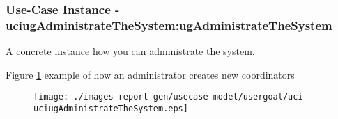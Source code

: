 
	\subsubsection{Use-Case Instance - uciugAdministrateTheSystem:ugAdministrateTheSystem}
	
	A concrete instance how you can administrate the system.		  
	\begin{operationmodel}
	
	\end{operationmodel} 

	
	Figure \ref{fig:lu.uni.lassy.excalibur.MyCrash.G02-RE-UC-uci-uciugAdministrateTheSystem}
	example of how an administrator creates new coordinators
	
	\begin{figure}[htbp]
	\begin{center}
	
	\texttt{[image: ./images-report-gen/usecase-model/usergoal/uci-uciugAdministrateTheSystem.eps]}
	\end{center}
	\caption[lu.uni.lassy.excalibur.MyCrash.G02 Sequence Diagram: uci-uciugAdministrateTheSystem]{}
	\label{fig:lu.uni.lassy.excalibur.MyCrash.G02-RE-UC-uci-uciugAdministrateTheSystem}
	\end{figure}
	\vspace{0.5cm}
